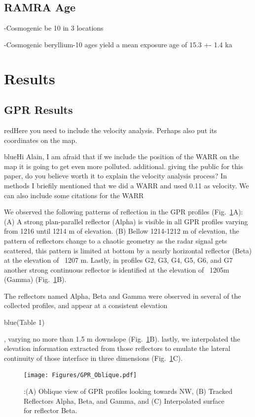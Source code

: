 \documentclass[utf8]{frontiersSCNS}
\newcommand{\COMON}{\begin{color}{blue}}
\newcommand{\COMOFF}{\end{color}}
\newcommand{\alon}{\begin{color}{red}}
\newcommand{\aloff}{\end{color}}
\begin{document}
\subsection{RAMRA Age}

-Cosmogenic be 10 in 3 locations

-Cosmogenic beryllium-10 ages yield a mean exposure age of 15.3 +- 1.4 ka



 
\section{Results}


\subsection{GPR Results}

\alon Here you need to include the velocity analysis. Perhaps also put
its coordinates on the map.\aloff


\COMON Hi Alain, I am afraid that if we include the position of the WARR on the map it is going to get even more polluted.
        additional. giving the public for this paper, do you believe worth it to explain the velocity analysis process? In methods I briefily mentioned that we did a WARR and used 0.11 as velocity. We can also include some citations for the WARR \COMOFF


We observed the following patterns of reflection in the GPR profiles (Fig.~\ref{GPR_Oblique}A): (A) A strong plan-parallel reflector (Alpha) is visible in all GPR profiles varying from 1216 until 1214 m of elevation. (B) Bellow 1214-1212 m of elevation, the pattern of reflectors change to a chaotic geometry as the radar signal gets scattered, this pattern is limited at bottom  by a nearly horizontal reflector (Beta)  at the elevation of ~1207 m. Lastly, in profiles G2,  G3, G4, G5, G6, and G7 another strong continuous reflector is identified at the elevation of ~1205m (Gamma) (Fig.~\ref{GPR_Oblique}B). 

The reflectors named Alpha, Beta and Gamma were observed in several of the collected profiles, and appear at a consistent elevation \COMON (Table 1) \COMOFF, varying no more than 1.5 m downslope (Fig.~\ref{GPR_Oblique}B). lastly, we interpolated the elevation information extracted from those reflectors to emulate the lateral continuity of those interface in three dimensions (Fig.~\ref{GPR_Oblique}C).  


								 \begin{figure}[h]

	\texttt{[image: Figures/GPR\_Oblique.pdf]}
		\caption{:(A) Oblique view of GPR profiles looking towards NW, (B) Tracked Reflectors Alpha, Beta, and Gamma, and (C) Interpolated surface for reflector Beta. \label{GPR_Oblique}}

								   \end{figure}
								   
\end{document}
